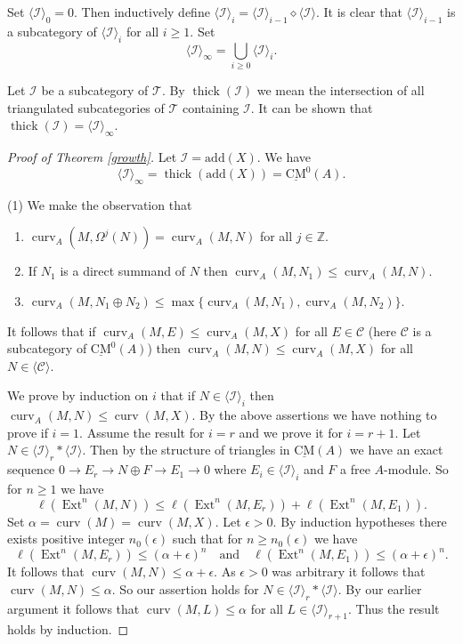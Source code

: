 \documentclass{amsart}
\newcommand{\Z}{\mathbb{Z} }
\newcommand{\C}{\mathcal{C}}
\newcommand{\Ic}{\mathcal{I} }
\newcommand{\Tc}{\mathcal{T} }
\newcommand{\rt}{\rightarrow}
\newcommand{\curv}{\operatorname{curv}}
\newcommand{\CMS}{\operatorname{\underline{CM}}}
\newcommand{\Ext}{\operatorname{Ext}}
\newcommand{\thick}{\operatorname{thick}}
\theoremstyle{plain}
\theoremstyle{definition}
\theoremstyle{remark}
\begin{document}
{Set $\langle \Ic \rangle_0 = 0$. Then inductively define $\langle   \Ic   \rangle_i = \langle \Ic \rangle_{i-1} \diamond  \langle \Ic  \rangle.$
It is clear that $\langle \Ic \rangle_{i-1} $ is a subcategory of  $\langle   \Ic   \rangle_i$ for all $i \geq 1$.
Set
$$ \langle \Ic\rangle_{\infty} = \bigcup_{i \geq 0} \langle   \Ic   \rangle_i.$$

\s \label{thick} Let $\Ic$ be a subcategory of $\Tc$. By $\thick(\Ic)$ we mean the intersection of all triangulated subcategories of $\Tc$ containing $\Ic$. It can be shown that
$ \thick(\Ic) =  \langle \Ic\rangle_{\infty}$.
\begin{proof}[Proof of Theorem \ref{growth}]
Let $\Ic = \text{add}(X)$. We have $$  \langle \Ic\rangle_{\infty}  = \thick(\text{add}(X)) = \CMS^0(A).$$

(1) We make the observation that
\begin{enumerate}[\rm (i)]
\item $\curv_A(M, \Omega^j(N)) = \curv_A(M, N)$ for all $j \in \Z$.
\item If $N_1$ is a direct summand of $N$ then
$\curv_A(M, N_1) \leq \curv_A(M, N)$.
\item
$\curv_A(M, N_1 \oplus N_2) \leq \max\{ \curv_A(M, N_1), \curv_A(M, N_2) \}$.
\end{enumerate}
It follows that if $\curv_A(M, E) \leq \curv_A(M, X)$ for all $E \in \C$ (here $\C$ is a subcategory of $\CMS^0(A)$) then
$\curv_A(M, N) \leq \curv_A(M, X)$ for all $N \in \langle \C  \rangle$.

We prove by induction on $i$ that if $N \in \langle   \Ic   \rangle_i $ then $\curv_A(M,N) \leq \curv(M, X)$.  By the above assertions we have nothing to prove if $i = 1$. Assume the result for $i = r$ and we prove it for $i = r +1$. Let $N \in \langle   \Ic   \rangle_r *  \langle   \Ic   \rangle $. Then by the structure of triangles in $\CMS(A)$ we have an exact sequence $0 \rt E_r \rt N \oplus F \rt E_1 \rt 0$ where $E_i \in \langle   \Ic   \rangle_i$ and $F$ a free $A$-module.
So for $n \geq 1$ we have
\[
\ell(\Ext^n(M, N)) \leq \ell(\Ext^n(M, E_r)) +  \ell(\Ext^n(M, E_1)).
\]
Set $\alpha = \curv(M) = \curv(M, X)$. Let $\epsilon > 0$. By induction hypotheses there exists positive integer $n_0(\epsilon)$  such that for $n \geq n_0(\epsilon)$ we have
\[
\ell(\Ext^n(M, E_r))  \leq (\alpha + \epsilon)^n \quad \text{and} \quad \ell(\Ext^n(M, E_1))  \leq (\alpha + \epsilon)^n.
\]
It follows that $\curv(M, N) \leq \alpha + \epsilon$. As $\epsilon > 0$ was arbitrary it follows that $\curv(M, N) \leq \alpha$. So our assertion holds for
$N \in \langle   \Ic   \rangle_r *  \langle   \Ic   \rangle $. By our earlier argument it follows that $\curv(M, L) \leq \alpha$ for all $L \in \langle   \Ic   \rangle_{r +1}$. Thus the result holds by induction.


\end{proof}}
\end{document}
